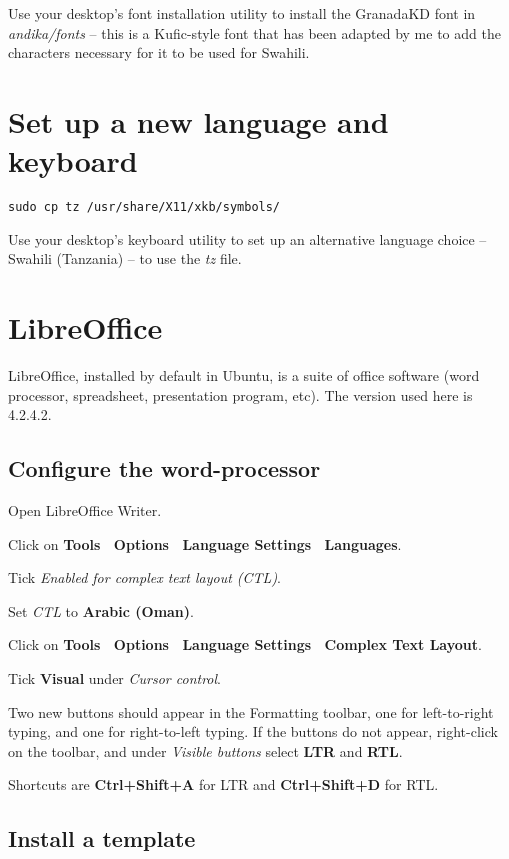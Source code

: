 \documentclass[a4paper,10pt]{article}
\begin{document}
Use your desktop's font installation utility to install the GranadaKD font in \textit{andika/fonts} -- this is a Kufic-style font that has been adapted by me to add the characters necessary for it to be used for Swahili.


\section{Set up a new language and keyboard}
\label{s:keyboard}

\verb|sudo cp tz /usr/share/X11/xkb/symbols/|

Use your desktop's keyboard utility to set up an alternative language choice -- Swahili (Tanzania) -- to use the \textit{tz} file.


\section{LibreOffice}
\label{s:libreoffice}

LibreOffice, installed by default in Ubuntu, is a suite of office software (word processor, spreadsheet, presentation program, etc).  The version used here is 4.2.4.2.

\subsection{Configure the word-processor}

Open LibreOffice Writer.

Click on \textbf{Tools \textrightarrow\ Options \textrightarrow\ Language Settings \textrightarrow\ Languages}.

Tick \textit{Enabled for complex text layout (CTL)}.

Set \textit{CTL} to \textbf{Arabic (Oman)}.

Click on \textbf{Tools \textrightarrow\ Options \textrightarrow\ Language Settings \textrightarrow\ Complex Text Layout}.

Tick \textbf{Visual} under \textit{Cursor control}.

Two new buttons should appear in the Formatting toolbar, one for left-to-right typing, and one for right-to-left typing.  If the buttons do not appear, right-click on the toolbar, and under \textit{Visible buttons} select \textbf{LTR} and \textbf{RTL}.

Shortcuts are \textbf{Ctrl+Shift+A} for LTR and \textbf{Ctrl+Shift+D} for RTL.

\subsection{Install a template}
\end{document}
